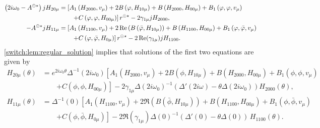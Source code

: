 \begin{align*}
\left(2i\omega_{0}-A^{\odot\star}\right)jH_{20\mu}
	& = \left[A_{1}\left(H_{2000},v_{\mu}\right)
		+2B\left(\varphi,H_{10\mu}\right) + B\left(H_{2000},H_{00\mu}\right)
		+B_1\left(\varphi,\varphi,v_{\mu}\right) \right. \\
 	& \left. \qquad
 	+ C\left(\varphi,\varphi,H_{00\mu}\right) \right] r^{\odot\star} -2\gamma_{1\mu}jH_{2000}, \\
-A^{\odot\star} jH_{11\mu}
	& = \left[A_{1}\left(H_{1100},v_{\mu}\right)
		+2\operatorname{Re}\left(B\left(\bar{\varphi},H_{10\mu}\right)\right)+B\left(H_{1100},H_{00\mu}\right)
		+B_1\left(\varphi,\bar{\varphi},v_{\mu}\right) \right. \\
	& \left. \qquad 
	+ C\left(\varphi,\bar{\varphi},H_{0\mu}\right) \right] r^{\odot\star} - 2\operatorname{Re}(\gamma_{1\mu}) jH_{1100}.
\end{align*}
\cref{switch:lem:regular_solution} implies that solutions of the first two equations are given by
\begin{align*}
    H_{20\mu}(\theta) &=e^{2i\omega_0\theta}\Delta^{-1}(2i\omega_0)\left[A_1\left(H_{2000},v_{\mu}\right)+2B\left(\phi,H_{10\mu}\right) +B\left(H_{2000},H_{00\mu}\right)+B_1\left(\phi,\phi,v_{\mu}\right) \right.\\
    & \qquad \left.+C\left(\phi,\phi,H_{00\mu}\right)\right] -2\gamma_{1\mu}\Delta(2i\omega_0)^{-1}\left(\Delta'(2i\omega)-\theta\Delta(2i\omega_0)\right) H_{2000}(\theta), \\
    H_{11\mu}(\theta) & =\Delta^{-1}(0)\left[A_{1}\left(H_{1100},v_{\mu}\right)+2\Re\left(B\left(\bar{\phi},H_{10\mu}\right)\right)+B\left(H_{1100},H_{00\mu}\right)+B_1\left(\phi,\bar{\phi},v_{\mu}\right) \right.\\
& \qquad \left.+C\left(\phi,\bar{\phi},H_{0\mu}\right)\right]-2\Re(\gamma_{1\mu})\Delta(0)^{-1}\left(\Delta'(0)-\theta\Delta(0)\right)\,H_{1100}(\theta).
\end{align*}
